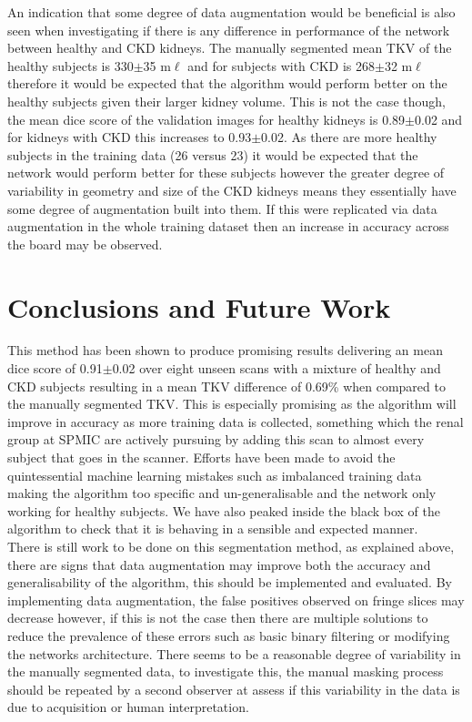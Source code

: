 An indication that some degree of data augmentation would be beneficial is also seen when investigating if there is any difference in performance of the network between healthy and \ac{CKD} kidneys. The manually segmented mean \ac{TKV} of the healthy subjects is 330$\pm$35 m$\ell$ and for subjects with \ac{CKD} is 268$\pm$32 m$\ell$ therefore it would be expected that the algorithm would perform better on the healthy subjects given their larger kidney volume. This is not the case though, the mean dice score of the validation images for healthy kidneys is 0.89$\pm$0.02 and for kidneys with \ac{CKD} this increases to 0.93$\pm$0.02. As there are more healthy subjects in the training data (26 versus 23) it would be expected that the network would perform better for these subjects however the greater degree of variability in geometry and size of the \ac{CKD} kidneys means they essentially have some degree of augmentation built into them. If this were replicated via data augmentation in the whole training dataset then an increase in accuracy across the board may be observed.\\

\newpage
\section{Conclusions and Future Work}

This method has been shown to produce promising results delivering an mean dice score of 0.91$\pm$0.02 over eight unseen scans with a mixture of healthy and \ac{CKD} subjects resulting in a mean \ac{TKV} difference of 0.69\% when compared to the manually segmented \ac{TKV}. This is especially promising as the algorithm will improve in accuracy as more training data is collected, something which the renal group at \ac{SPMIC} are actively pursuing by adding this scan to almost every subject that goes in the scanner. Efforts have been made to avoid the quintessential machine learning mistakes such as imbalanced training data making the algorithm too specific and un-generalisable and the network only working for healthy subjects. We have also peaked inside the black box of the algorithm to check that it is behaving in a sensible and expected manner.\\

There is still work to be done on this segmentation method, as explained above, there are signs that data augmentation may improve both the accuracy and generalisability of the algorithm, this should be implemented and evaluated. By implementing data augmentation, the false positives observed on fringe slices may decrease however, if this is not the case then there are multiple solutions to reduce the prevalence of these errors such as basic binary filtering or modifying the networks architecture. There seems to be a reasonable degree of variability in the manually segmented data, to investigate this, the manual masking process should be repeated by a second observer at assess if this variability in the data is due to acquisition or human interpretation.\\

